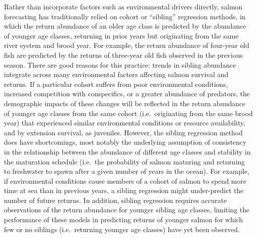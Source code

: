 \documentclass[
]{article}
\begin{document}
Rather than incorporate factors such as environmental drivers directly, salmon forecasting has traditionally relied on cohort or ``sibling'' regression methods, in which the return abundance of an older age class is predicted by the abundance of younger age classes, returning in prior years but originating from the same river system and brood year. For example, the return abundance of four-year old fish are predicted by the returns of three-year old fish observed in the previous season. There are good reasons for this practice: trends in sibling abundance integrate across many environmental factors affecting salmon survival and returns. If a particular cohort suffers from poor environmental conditions, increased competition with conspecifics, or a greater abundance of predators, the demographic impacts of these changes will be reflected in the return abundance of younger age classes from the same cohort (i.e.~originating from the same brood year) that experienced similar environmental conditions or resource availability, and by extension survival, as juveniles. However, the sibling regression method does have shortcomings, most notably the underlying assumption of consistency in the relationship between the abundance of different age classes and stability in the maturation schedule (i.e.~the probability of salmon maturing and returning to freshwater to spawn after a given number of years in the ocean). For example, if environmental conditions cause members of a cohort of salmon to spend more time at sea than in previous years, a sibling regression might under-predict the number of future returns. In addition, sibling regression requires accurate observations of the return abundance for younger sibling age classes, limiting the performance of these models in predicting returns of younger salmon for which few or no siblings (i.e.~returning younger age classes) have yet been observed.
\end{document}
